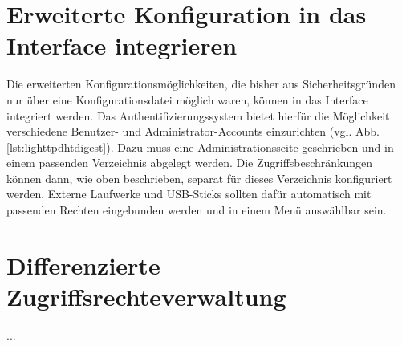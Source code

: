 \section{Erweiterte Konfiguration in das Interface integrieren}
Die erweiterten Konfigurationsmöglichkeiten, die bisher aus Sicherheitsgründen nur über eine Konfigurationsdatei möglich waren, können in das Interface integriert werden. Das Authentifizierungssystem bietet hierfür die Möglichkeit verschiedene Benutzer- und Administrator-Accounts einzurichten (vgl. Abb. \ref{lst:lighttpdhtdigest}). Dazu muss eine Administrationsseite geschrieben und in einem passenden Verzeichnis abgelegt werden. Die Zugriffsbeschränkungen können dann, wie oben beschrieben, separat für dieses Verzeichnis konfiguriert werden. Externe Laufwerke und USB-Sticks sollten dafür automatisch mit passenden Rechten eingebunden werden und in einem Menü auswählbar sein.


\section{Differenzierte Zugriffsrechteverwaltung}
...